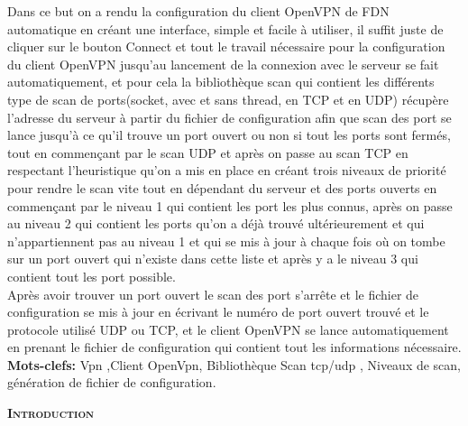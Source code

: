 \documentclass[12pt,a4paper]{article}
\begin{document}
Dans ce but on a rendu la configuration du client OpenVPN de FDN automatique en créant une interface, simple et facile à utiliser, il suffit juste de cliquer sur le bouton Connect et tout le travail nécessaire pour la configuration du client OpenVPN jusqu'au lancement de la connexion avec le serveur se fait automatiquement, et pour cela la bibliothèque scan qui contient les différents type de scan de ports(socket, avec et sans thread, en TCP et en UDP) récupère l'adresse du serveur à partir du fichier de configuration afin que scan des port se lance jusqu'à ce qu'il trouve un port ouvert ou non si tout les ports sont fermés, tout en commençant par le scan UDP et après on passe au scan TCP en respectant l'heuristique qu'on a mis en place en créant trois niveaux de priorité pour rendre le scan vite tout en dépendant du serveur et des ports ouverts en commençant par le niveau 1 qui contient les port les plus connus, après on passe au niveau 2 qui contient les ports qu'on a déjà trouvé ultérieurement et qui n'appartiennent pas au niveau 1 et qui se mis à jour à chaque fois où on tombe sur un port ouvert qui n'existe dans cette liste et après y a le niveau 3 qui contient tout les port possible.\\

Après avoir trouver un port ouvert le scan des port s'arrête et le fichier de configuration se mis à jour en écrivant le numéro de port ouvert trouvé et le protocole utilisé UDP ou TCP, et le client OpenVPN se lance automatiquement en prenant le fichier de configuration qui contient tout les informations nécessaire.\\



\textbf{Mots-clefs:} Vpn ,Client OpenVpn, Bibliothèque Scan tcp/udp ,  Niveaux de scan, génération de fichier de configuration.\\

\begin{flushleft}
\end{flushleft}

\newpage

\tableofcontents 
\newpage

\textsc{\LARGE \bfseries Introduction }\\  \\ 
\end{document}
